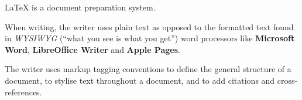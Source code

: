 \documentclass[varwidth, margin=4pt]{standalone}
\begin{document}
\qquad
\LaTeX{} is a document preparation system.

\qquad
{\adventor When writing, the writer uses plain text as opposed to the formatted text found in
  \textit{WYSIWYG} (``what you see is what you get'') word processors like \textbf{Microsoft Word},
  \textbf{LibreOffice Writer} and \textbf{Apple Pages}.}

\qquad
{The writer uses markup tagging conventions to define the general structure
  of a document, to stylise text throughout a document, and to add citations and cross-references.}
\end{document}

